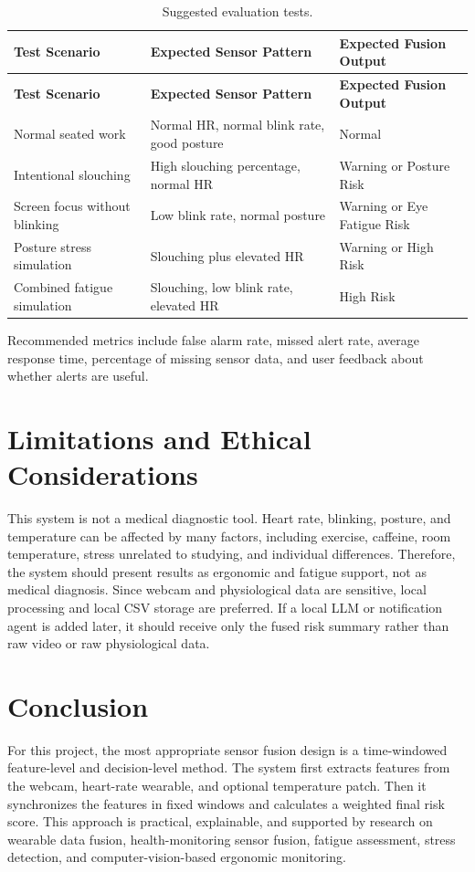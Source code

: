 \documentclass[11pt,a4paper]{article}
\begin{document}
\begin{longtable}{p{}p{}p{}}
\caption{Suggested evaluation tests.}\\
\toprule
\textbf{Test Scenario} & \textbf{Expected Sensor Pattern} & \textbf{Expected Fusion Output} \\
\midrule
\endfirsthead
\toprule
\textbf{Test Scenario} & \textbf{Expected Sensor Pattern} & \textbf{Expected Fusion Output} \\
\midrule
\endhead
Normal seated work & Normal HR, normal blink rate, good posture & Normal \\
Intentional slouching & High slouching percentage, normal HR & Warning or Posture Risk \\
Screen focus without blinking & Low blink rate, normal posture & Warning or Eye Fatigue Risk \\
Posture stress simulation & Slouching plus elevated HR & Warning or High Risk \\
Combined fatigue simulation & Slouching, low blink rate, elevated HR & High Risk \\
\bottomrule
\end{longtable}

Recommended metrics include false alarm rate, missed alert rate, average response time, percentage of missing sensor data, and user feedback about whether alerts are useful.

\section{Limitations and Ethical Considerations}

This system is not a medical diagnostic tool. Heart rate, blinking, posture, and temperature can be affected by many factors, including exercise, caffeine, room temperature, stress unrelated to studying, and individual differences. Therefore, the system should present results as ergonomic and fatigue support, not as medical diagnosis. Since webcam and physiological data are sensitive, local processing and local CSV storage are preferred. If a local LLM or notification agent is added later, it should receive only the fused risk summary rather than raw video or raw physiological data.

\section{Conclusion}

For this project, the most appropriate sensor fusion design is a time-windowed feature-level and decision-level method. The system first extracts features from the webcam, heart-rate wearable, and optional temperature patch. Then it synchronizes the features in fixed windows and calculates a weighted final risk score. This approach is practical, explainable, and supported by research on wearable data fusion, health-monitoring sensor fusion, fatigue assessment, stress detection, and computer-vision-based ergonomic monitoring.
\end{document}
